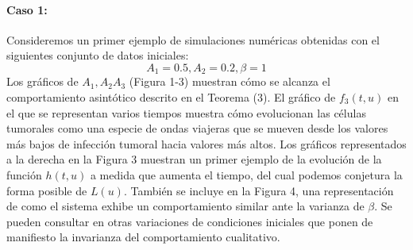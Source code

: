 \documentclass[1p]{elsarticle}
\begin{document}
\paragraph{Caso 1:} Consideremos un primer ejemplo de simulaciones numéricas obtenidas con el siguientes conjunto de datos iniciales:
$$A_1 = 0.5, A_2 = 0.2, \beta = 1$$
 Los gráficos de $A_1, A_2 A_3$ (Figura 1-3) muestran cómo se alcanza el comportamiento asintótico descrito en el Teorema (3). El gráfico de $f_3(t, u)$ en el que se representan varios tiempos muestra cómo evolucionan las células tumorales como una especie de ondas viajeras que se mueven desde los valores más bajos de infección tumoral hacia valores más altos. Los gráficos representados a la derecha en la Figura 3 muestran un primer ejemplo de la evolución de la función $h (t, u)$ a medida que aumenta el tiempo, del cual podemos conjetura la forma posible de $L (u)$. También se incluye en la Figura 4,  una representación de como el sistema exhibe un comportamiento similar ante la varianza de $\beta$. Se pueden consultar en \cite{original} otras variaciones de condiciones iniciales que ponen de manifiesto la invarianza del comportamiento cualitativo.
\end{document}
